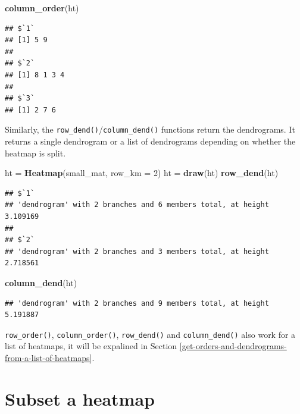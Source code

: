 \documentclass[]{book}
\newenvironment{Shaded}{\begin{snugshade}}{\end{snugshade}}
\newcommand{\KeywordTok}[1]{\textcolor[rgb]{0.13,0.29,0.53}{\textbf{#1}}}
\newcommand{\DataTypeTok}[1]{\textcolor[rgb]{0.13,0.29,0.53}{#1}}
\newcommand{\DecValTok}[1]{\textcolor[rgb]{0.00,0.00,0.81}{#1}}
\newcommand{\StringTok}[1]{\textcolor[rgb]{0.31,0.60,0.02}{#1}}
\newcommand{\NormalTok}[1]{#1}
\theoremstyle{definition}
\theoremstyle{definition}
\theoremstyle{definition}
\theoremstyle{remark}
\begin{document}
\begin{Shaded}
\begin{Highlighting}[]
\KeywordTok{column_order}\NormalTok{(ht)}
\end{Highlighting}
\end{Shaded}

\begin{verbatim}
## $`1`
## [1] 5 9
## 
## $`2`
## [1] 8 1 3 4
## 
## $`3`
## [1] 2 7 6
\end{verbatim}

Similarly, the \texttt{row\_dend()}/\texttt{column\_dend()} functions
return the dendrograms. It returns a single dendrogram or a list of
dendrograms depending on whether the heatmap is split.

\begin{Shaded}
\begin{Highlighting}[]
\NormalTok{ht =}\StringTok{ }\KeywordTok{Heatmap}\NormalTok{(small_mat, }\DataTypeTok{row_km =} \DecValTok{2}\NormalTok{)}
\NormalTok{ht =}\StringTok{ }\KeywordTok{draw}\NormalTok{(ht)}
\KeywordTok{row_dend}\NormalTok{(ht)}
\end{Highlighting}
\end{Shaded}

\begin{verbatim}
## $`1`
## 'dendrogram' with 2 branches and 6 members total, at height 3.109169 
## 
## $`2`
## 'dendrogram' with 2 branches and 3 members total, at height 2.718561
\end{verbatim}

\begin{Shaded}
\begin{Highlighting}[]
\KeywordTok{column_dend}\NormalTok{(ht)}
\end{Highlighting}
\end{Shaded}

\begin{verbatim}
## 'dendrogram' with 2 branches and 9 members total, at height 5.191887
\end{verbatim}

\texttt{row\_order()}, \texttt{column\_order()}, \texttt{row\_dend()}
and \texttt{column\_dend()} also work for a list of heatmaps, it will be
expalined in Section
\ref{get-orders-and-dendrograms-from-a-list-of-heatmaps}.

\section{Subset a heatmap}\label{subset-a-heatmap}
\end{document}
